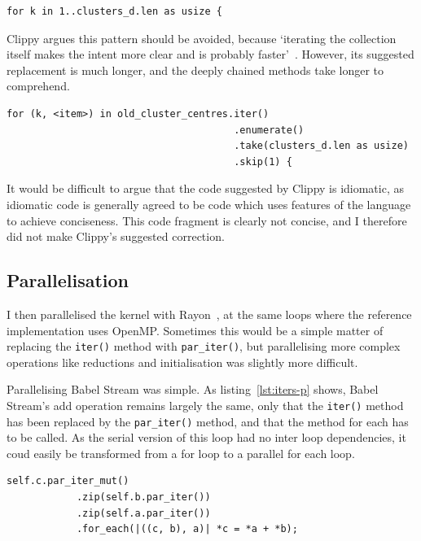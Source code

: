 \begin{code}
\begin{verbatim}
for k in 1..clusters_d.len as usize {
\end{verbatim}
\label{lst:for-concise}
\end{code}
Clippy argues this pattern should be avoided, because `iterating the collection itself makes the intent more clear and is probably faster'~\cite{ClippyLoop}. However, its suggested replacement is much longer, and the deeply chained methods take longer to comprehend.
\begin{code}
\begin{verbatim}
for (k, <item>) in old_cluster_centres.iter()
                                       .enumerate()
                                       .take(clusters_d.len as usize)
                                       .skip(1) {
\end{verbatim}
\end{code}
It would be difficult to argue that the code suggested by Clippy is idiomatic, as idiomatic code is generally agreed to be code which uses features of the language to achieve conciseness. This code fragment is clearly not concise, and I therefore did not make Clippy's suggested correction.
\subsection{Parallelisation}
I then parallelised the kernel with Rayon~\cite{RustRayon}, at the same loops where the reference implementation uses OpenMP\@. Sometimes this would be a simple matter of replacing the \texttt{iter()} method with \texttt{par\_iter()}, but parallelising more complex operations like reductions and initialisation was slightly more difficult.

Parallelising Babel Stream was simple. As listing~\ref{lst:iters-p} shows, Babel Stream's add operation remains largely the same, only that the \texttt{iter()} method has been replaced by the \texttt{par\_iter()} method, and that the method for each has to be called. As the serial version of this loop had no inter loop dependencies, it coud easily be transformed from a for loop to a parallel for each loop.
\begin{code}

\label{lst:iters-p}
\begin{verbatim}
self.c.par_iter_mut()
            .zip(self.b.par_iter())
            .zip(self.a.par_iter())
            .for_each(|((c, b), a)| *c = *a + *b);
\end{verbatim}
\end{code}

